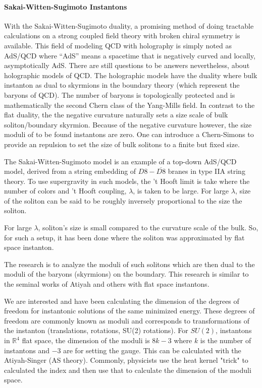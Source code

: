 \documentclass[12pt]{article}
\begin{document}
\paragraph{Sakai-Witten-Sugimoto Instantons}

With the Sakai-Witten-Sugimoto duality, a promising method of doing tractable calculations on a strong coupled field theory with broken chiral symmetry is available.
This field of modeling QCD with holography is simply noted as AdS/QCD where ``AdS'' means a spacetime that is negatively curved and locally, asymptotically AdS.
There are still questions to be answers nevertheless, about holographic models of QCD.
The holographic models have the duality where bulk instanton as dual to skyrmions in the boundary theory (which represent the baryons of QCD).
The number of baryons is topologically protected and is mathematically the second Chern class of the Yang-Mills field.
In contrast to the flat duality, the the negative curvature naturally sets a size scale of bulk soliton/boundary skyrmion.
Because of the negative curvature however, the size moduli of to be found instantons are zero.
One can introduce a Chern-Simons to provide an repulsion to set the size of bulk solitons to a finite but fixed size.

The Sakai-Witten-Sugimoto model is an example of a top-down AdS/QCD model, derived from a string embedding of $D8-\overline{D8}$ branes in type IIA string theory.
To use supergravity in such models, the 't Hooft limit is take where the number of colors and 't Hooft coupling, $\lambda$, is taken to be large.
For large $\lambda$, size of the soliton can be said to be roughly inversely proportional to the size the soliton.

For large $\lambda$, soliton's size is small compared to the curvature scale of the bulk. 
So, for such a setup, it has been done where the soliton was approximated by flat space instanton.

The research is to analyze the moduli of such solitons which are then dual to the moduli of the baryons (skyrmions) on the boundary.
This research is similar to the seminal works of Atiyah and others with flat space instantons.

We are interested and have been calculating the dimension of the degrees of freedom for instantonic solutions of the same minimized energy.
These degrees of freedom are commonly known as moduli and corresponds to transformations of the instanton (translations, rotations, SU(2) rotations).
For $SU(2)$, instantons in $\mathds{R}^4$ flat space, the dimension of the moduli is $8k - 3$ where $k$ is the number of instantons and $-3$ are for setting the gauge.
This can be calculated with the Atiyah-Singer (AS theory).
Commonly, physicists use the heat kernel "trick" to calculated the index and then use that to calculate the dimension of the moduli space.
\end{document}

